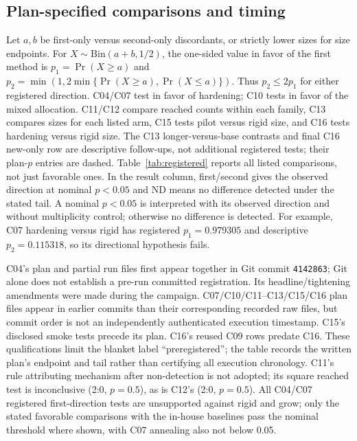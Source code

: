 \documentclass[11pt]{article}
\begin{document}
\subsection{Plan-specified comparisons and timing}
Let $a,b$ be first-only versus second-only discordants, or strictly lower sizes for size endpoints. For $X\sim\mathrm{Bin}(a+b,1/2)$, the one-sided value in favor of the first method is $p_1=\Pr(X\ge a)$ and $p_2=\min(1,2\min\{\Pr(X\ge a),\Pr(X\le a)\})$. Thus $p_2\le2p_1$ for either registered direction. C04/C07 test in favor of hardening; C10 tests in favor of the mixed allocation. C11/C12 compare reached counts within each family, C13 compares sizes for each listed arm, C15 tests pilot versus rigid size, and C16 tests hardening versus rigid size. The C13 longer-versus-base contrasts and final C16 new-only row are descriptive follow-ups, not additional registered tests; their plan-$p$ entries are dashed. Table~\ref{tab:registered} reports all listed comparisons, not just favorable ones. In the result column, first/second gives the observed direction at nominal $p<0.05$ and ND means no difference detected under the stated tail. A nominal $p<0.05$ is interpreted with its observed direction and without multiplicity control; otherwise no difference is detected. For example, C07 hardening versus rigid has registered $p_1=0.979305$ and descriptive $p_2=0.115318$, so its directional hypothesis fails.



C04's plan and partial run files first appear together in Git commit \texttt{4142863}; Git alone does not establish a pre-run committed registration. Its headline/tightening amendments were made during the campaign. C07/C10/C11--C13/C15/C16 plan files appear in earlier commits than their corresponding recorded raw files, but commit order is not an independently authenticated execution timestamp. C15's disclosed smoke tests precede its plan. C16's reused C09 rows predate C16. These qualifications limit the blanket label ``preregistered''; the table records the written plan's endpoint and tail rather than certifying all execution chronology. C11's rule attributing mechanism after non-detection is not adopted; its square reached test is inconclusive (2:0, $p=0.5$), as is C12's (2:0, $p=0.5$). All C04/C07 registered first-direction tests are unsupported against rigid and grow; only the stated favorable comparisons with the in-house baselines pass the nominal threshold where shown, with C07 annealing also not below 0.05.
\end{document}
